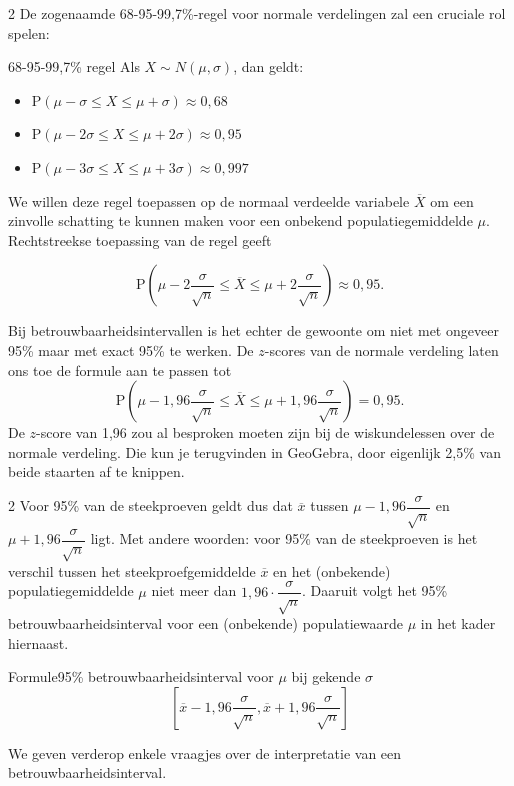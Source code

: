 \begin{multicols}{2}
De zogenaamde 68-95-99,7\%-regel voor normale verdelingen zal een cruciale rol spelen:
	\begin{kader}{}{68-95-99,7\% regel}
            Als $X \sim N(\mu,\sigma)$, dan geldt:
            \begin{itemize}
                \item $\textrm{P}(\mu-\sigma \leq X \leq \mu+\sigma) \approx 0,68$
                \item $\textrm{P}(\mu-2\sigma \leq X \leq \mu+2\sigma) \approx 0,95$
                \item $\textrm{P}(\mu-3\sigma \leq X \leq \mu+3\sigma) \approx 0,997$
            \end{itemize}
        \end{kader}
        
We willen deze regel toepassen op de normaal verdeelde variabele $\overline{X}$ om een zinvolle schatting te kunnen maken voor een onbekend populatiegemiddelde $\mu$.
\columnbreak
Rechtstreekse toepassing van de regel geeft

\[ \textrm{P}\left(\mu-2\frac{\sigma}{\sqrt{n}} \leq \overline{X} \leq \mu+2\frac{\sigma}{\sqrt{n}}\right) \approx 0,95. \]

Bij betrouwbaarheidsintervallen is het echter de gewoonte om niet met ongeveer 95\% maar met exact 95\% te werken. De $z$-scores van de normale verdeling laten ons toe de formule aan te passen tot
\[ \textrm{P}\left(\mu-1,96\frac{\sigma}{\sqrt{n}} \leq \overline{X} \leq \mu+1,96\frac{\sigma}{\sqrt{n}}\right) = 0,95. \] De $z$-score van 1,96 zou al besproken moeten zijn bij de wiskundelessen over de normale verdeling. Die kun je terugvinden in GeoGebra, door eigenlijk 2,5\% van beide staarten af te knippen.
\end{multicols}


\begin{multicols}{2}
Voor 95\% van de steekproeven geldt dus dat $\overline{x}$ tussen $\mu - 1,96\dfrac{\sigma}{\sqrt{n}}$ en $\mu + 1,96\dfrac{\sigma}{\sqrt{n}}$ ligt. Met andere woorden: voor 95\% van de steekproeven is het verschil tussen het steekproefgemiddelde $\overline{x}$ en het (onbekende) populatiegemiddelde $\mu$ niet meer dan $1,96 \cdot \dfrac{\sigma}{\sqrt{n}}$. Daaruit volgt het 95\% betrouwbaarheidsinterval voor een (onbekende) populatiewaarde $\mu$ in het kader hiernaast.
\begin{kader}{Formule}{95\% betrouwbaarheidsinterval voor $\mu$ bij gekende $\sigma$}
\begin{equation}
\left[ \overline{x} - 1,96 \frac{\sigma}{\sqrt{n}}, \overline{x} + 1,96 \frac{\sigma}{\sqrt{n}} \right] 
\end{equation}
\end{kader}

We geven verderop enkele vraagjes over de interpretatie van een betrouwbaarheidsinterval.

\end{multicols}

